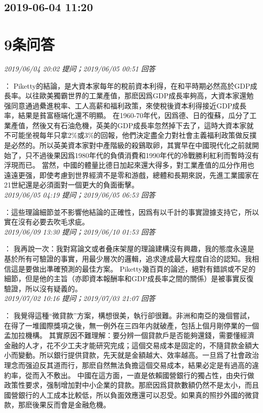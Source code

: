 \documentclass[twocolumn]{ctexart}
\begin{document}
\subsection{2019-06-04 11:20}


\section{9条问答}

\textit{\hfill\noindent\small 2019/06/04 20:02 提问；2019/06/05 00:51 回答}

：
Piketty的結論，是大資本家每年的稅前資本利得，在和平時期必然高於GDP成長率。以往歐美獨霸世界的工業產值，那麽因爲GDP成長率夠高，大資本家還勉强同意通過纍進稅率、工人高薪和福利政策，來使稅後資本利得接近GDP成長率，結果是貧富極端化還不明顯。 
在1960-70年代，因爲德、日的復蘇，瓜分了工業產值，然後又有石油危機，英美的GDP成長率忽然掉下去了，這時大資本家就不可能坐視每年只拿2\%或3\%的回報，他們決定盡全力對社會主義福利政策做反撲是必然的。所以英美資本家對中產階級的殺鷄取卵，其實早在中國現代化之前就開始了，只不過後果因爲1980年代的負債消費和1990年代的冷戰勝利紅利而暫時沒有浮現而已。 
當然，中國的體量比德日加起來還大得多，對工業產值的瓜分作用也遠遠更强，即使考慮到世界經濟不是零和游戲，總體和長期來説，先進工業國家在21世紀還是必須面對一個更大的負面衝擊。
\\

\textit{\hfill\noindent\small 2019/06/05 04:19 提问；2019/06/05 06:53 回答}

：這些理論細節並不影響他結論的正確性，因爲有以千計的事實證據支持它，所以實在沒有必要去吹毛求疵。
\\

\textit{\hfill\noindent\small 2019/06/09 13:30 提问；2019/06/10 01:53 回答}

：
我再說一次：我對寫論文或者叠床架屋的理論建構沒有興趣，我的態度永遠是基於所有可驗證的事實，用最少層次的邏輯，追求達成最大程度自洽的認知。我相信這是要做出準確預測的最佳方案。
Piketty幾百頁的論述，絕對有錯誤或不足的細節，但是他的主旨（亦即資本報酬率和GDP成長率之間的關係）是被事實反復驗證，所以沒有疑義的。
\\

\textit{\hfill\noindent\small 2019/07/02 10:16 提问；2019/07/03 21:07 回答}

：
我覺得這種“微貸款”方案，構想很美，執行卻很難。非洲和南亞的幾個嘗試，在得了一堆國際獎項之後，無一例外在三四年内就破產，包括上個月剛停業的一個孟加拉機構。
其實原因不難理解：要分辨一個貸款戶是否能夠還錢，需要懂經濟金融的人才，花不少工夫才能研究完成；這個交易成本是固定的，不隨貸款金額大小而變動。所以銀行提供貸款，先天就是金額越大、效率越高。一旦爲了社會政治理念而强迫反其道而行，那麽自然無法負擔這個交易成本，結果必定是有過高的違約率，從而入不敷出。
中國在這方面，一直是依賴國營銀行的獨占性，由央行做政策性要求，强制增加對中小企業的貸款。那麽因爲貸款數額仍然不是太小，而且國營銀行的人工成本比較低，所以負面效應還可以忍受。如果真的照抄外國的微貸款，那麽後果反而會是金融危機。
\\
\end{document}
